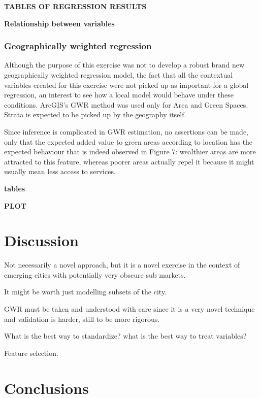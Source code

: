 \documentclass[journal]{IEEEtran}
\begin{document}
\textbf{TABLES OF REGRESSION RESULTS}

\textbf{Relationship between variables}

\subsubsection*{Geographically weighted regression}

Although the purpose of this exercise was not to develop a robust brand new geographically weighted regression model, the fact that all the contextual variables created for this exercise were not picked up as important for a global regression, an interest to see how a local model would behave under these conditions. ArcGIS’s GWR method
was used only for Area and Green Spaces. Strata is expected to be picked up by the geography itself.

Since inference is complicated in GWR estimation, no assertions can be made, only that the expected added value to green areas according to location has the expected behaviour that is indeed observed
in Figure 7: wealthier areas are more attracted to this feature, whereas poorer areas actually repel it because it might usually mean less access to services.
	
\textbf{tables}

\textbf{PLOT}

\section{Discussion}

Not necessarily a novel approach, but it is a novel exercise in the context of emerging cities with potentially very obscure sub markets.

It might be worth just modelling subsets of the city.

GWR must be taken and understood with care since it is a very novel technique and validation is harder, still to be more rigorous.

What is the best way to standardize? what is the best way to treat variables?

Feature selection.

\section{Conclusions}
\end{document}
